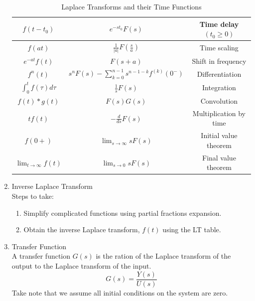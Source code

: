 \begin{enumerate}
\begin{table}[h]
\begin{center}
\begin{tabular}{|c|c|c|}
    $f(t - t_0)$ & $e^{-st_0}F(s)$ & Time delay $(t_0 \geq 0)$ \\ \hline
    $f(at)$ & $\displaystyle \frac{1}{|a|}F\left(\frac{s}{a}\right)$ & Time scaling  \\ \hline
    $e^{-at}f(t)$ & $F(s + a)$ & Shift in frequency \\ \hline
    $f^n(t)$ & $\displaystyle s^n F(s) - \sum_{k=0}^{n-1}s^{n-1-k}f^{(k)}(0^-)$ & Differentiation \\ \hline
    $\int_{0}^{t} f(\tau)d\tau$ & $\frac{1}{s}F(s)$ & Integration \\ \hline
    $f(t) * g(t)$ & $F(s)G(s)$ & Convolution \\ \hline
    $tf(t)$ & $-\frac{d}{ds}F(s)$ & Multiplication by time \\ \hline
    $f(0+)$ & $\displaystyle \lim_{s\to\infty} sF(s)$ & Initial value theorem \\ \hline
    $\displaystyle \lim_{t\to\infty} f(t)$ & $\displaystyle \lim_{s\to0} sF(s)$ & Final value theorem \\ \hline
    \end{tabular}
    \end{center}
    \caption{Laplace Transforms and their Time Functions}
    \label{table:laplace}
    \end{table}
\item Inverse Laplace Transform\\
Steps to take:
\begin{enumerate}
    \item Simplify complicated functions using partial fractions expansion.
    \item Obtain the inverse Laplace transform, $f(t)$ using the LT table.
\end{enumerate}
\item Transfer Function \\
A transfer function $G(s)$ is the ration of the Laplace transform of the output to the Laplace transform of the input.
\begin{equation}
    G(s) = \frac{Y(s)}{U(s)}
\end{equation}
Take note that we assume all initial conditions on the system are zero.
\end{enumerate}


